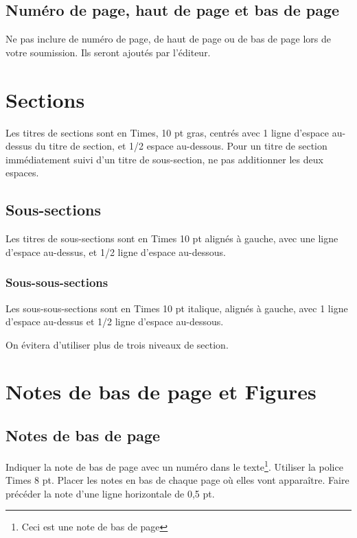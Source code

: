 \documentclass{article}
\begin{document}
\subsection{Numéro de page, haut de page et  bas de page}

Ne pas inclure  de numéro de page, de haut de page ou de bas de page lors de votre soumission. Ils seront ajoutés par l'éditeur.

\section{Sections}

Les titres de sections sont en Times, 10 pt gras, centrés avec 1 ligne d'espace au-dessus du titre de section, et 1/2 espace au-dessous. Pour un titre de section immédiatement suivi d'un titre de sous-section, ne pas additionner les deux espaces.

\subsection{Sous-sections}

Les titres de sous-sections sont en Times 10 pt alignés à gauche, avec une ligne d'espace au-dessus, et 1/2 ligne d'espace au-dessous.

\subsubsection{Sous-sous-sections}

Les sous-sous-sections sont en Times 10 pt italique, alignés à gauche, avec 1 ligne d'espace au-dessus et 1/2 ligne d'espace au-dessous.

On évitera d'utiliser plus de trois niveaux de section.


\section{Notes de bas de page et Figures}

\subsection{Notes de bas de page}

Indiquer la note de bas de page avec un numéro dans le texte\footnote{Ceci est une note de bas de page}.  Utiliser la police Times 8 pt. Placer les notes en bas de chaque page où elles vont apparaître. Faire précéder la note d'une ligne horizontale de 0,5 pt.
\end{document}
